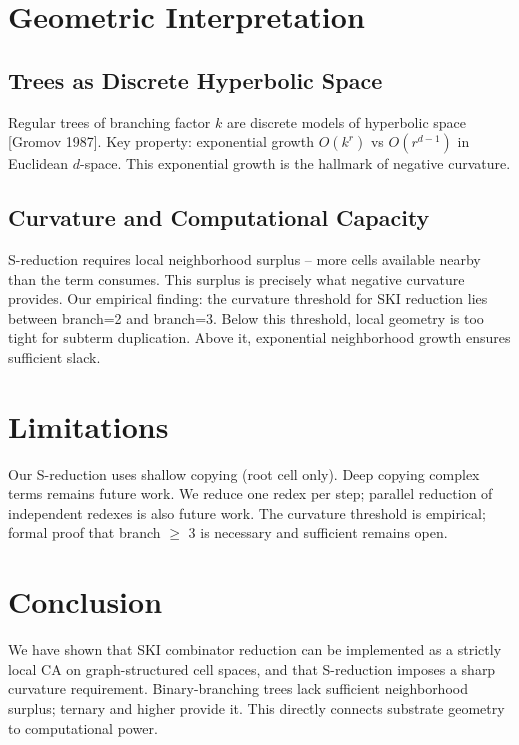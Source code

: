\documentclass[11pt]{article}
\begin{document}
\section{Geometric Interpretation}

\subsection{Trees as Discrete Hyperbolic Space}

Regular trees of branching factor $k$ are discrete models of hyperbolic space [Gromov 1987]. Key property: exponential growth $O(k^r)$ vs $O(r^{d-1})$ in Euclidean $d$-space. This exponential growth is the hallmark of negative curvature.

\subsection{Curvature and Computational Capacity}

S-reduction requires local neighborhood surplus -- more cells available nearby than the term consumes. This surplus is precisely what negative curvature provides. Our empirical finding: the curvature threshold for SKI reduction lies between branch=2 and branch=3. Below this threshold, local geometry is too tight for subterm duplication. Above it, exponential neighborhood growth ensures sufficient slack.

\section{Limitations}

Our S-reduction uses shallow copying (root cell only). Deep copying complex terms remains future work. We reduce one redex per step; parallel reduction of independent redexes is also future work. The curvature threshold is empirical; formal proof that branch $\geq$ 3 is necessary and sufficient remains open.

\section{Conclusion}

We have shown that SKI combinator reduction can be implemented as a strictly local CA on graph-structured cell spaces, and that S-reduction imposes a sharp curvature requirement. Binary-branching trees lack sufficient neighborhood surplus; ternary and higher provide it. This directly connects substrate geometry to computational power.
\end{document}
